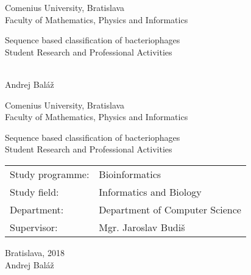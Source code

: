 \documentclass[12pt, oneside]{book}
\def\mfrok{2018}
\def\mfnazov{Sequence based classification of bacteriophages}
\def\mftyp{Student Research and Professional Activities}
\def\mfautor{Andrej Baláž}
\def\mfskolitel{Mgr. Jaroslav Budiš}
\def\mfkonzultant{tit. Meno Priezvisko, tit. }
\def\mfmiesto{Bratislava, \mfrok}
\def\mfodbor{Informatics and Biology}
\def\program{ Bioinformatics }
\def\mfpracovisko{ Department of Computer Science }
\begin{document}
     
\frontmatter


\thispagestyle{empty}

\begin{center}
\sc\large
Comenius University, Bratislava\\
Faculty of Mathematics, Physics and Informatics

\vfill

{\LARGE\mfnazov}\\
\mftyp
\end{center}

\vfill

{\sc\large 
\noindent \mfrok\\
\mfautor
}

\eject %


\thispagestyle{empty}
\noindent

\begin{center}
\sc  
\large
Comenius University, Bratislava\\
Faculty of Mathematics, Physics and Informatics

\vfill

{\LARGE\mfnazov}\\
\mftyp
\end{center}

\vfill

\noindent
\begin{tabular}{ll}
Study programme: & \program \\
Study field: & \mfodbor \\
Department: & \mfpracovisko \\
Supervisor: & \mfskolitel \\
\end{tabular}

\vfill


\noindent \mfmiesto\\
\mfautor

\eject %





%
\end{document}
